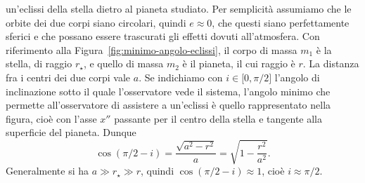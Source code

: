 un'eclissi della stella dietro al pianeta studiato. Per semplicità assumiamo che
le orbite dei due corpi siano circolari, quindi $e \approx 0$, che questi siano
perfettamente sferici e che possano essere trascurati gli effetti dovuti
all'atmosfera. Con riferimento alla Figura~\ref{fig:minimo-angolo-eclissi}, il
corpo di massa $m_1$ è la stella, di raggio $r_\star$, e quello di massa $m_2$ è
il pianeta, il cui raggio è $r$. La distanza fra i centri dei due corpi vale
$a$. Se indichiamo con $i \in \mathopen{[}0, \pi/2\mathclose{]}$ l'angolo di
inclinazione sotto il quale l'osservatore vede il sistema, l'angolo minimo che
permette all'osservatore di assistere a un'eclissi è quello rappresentato nella
figura, cioè con l'asse $x''$ passante per il centro della stella e tangente
alla superficie del pianeta. Dunque
\begin{equation}
  \cos(\pi/2 - i) = \frac{\sqrt{a^2 - r^2}}{a} = \sqrt{1 - \frac{r^2}{a^2}}.
\end{equation}
Generalmente si ha $a \gg r_\star \gg r$, quindi $\cos(\pi/2 - i) \approx 1$,
cioè $i \approx \pi/2$.

